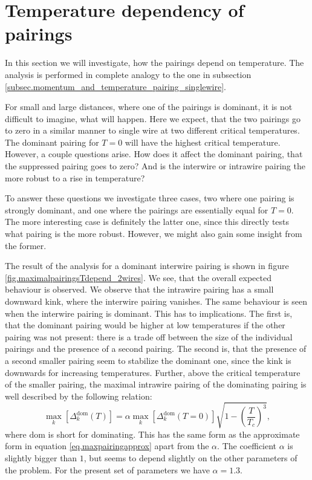 \section{Temperature dependency of pairings} \label{sec.2wirespairingstemperature}
In this section we will investigate, how the pairings depend on temperature. The analysis is performed in complete analogy to the one in subsection \ref{subsec.momentum_and_temperature_pairing_singlewire}. 

For small and large distances, where one of the pairings is dominant, it is not difficult to imagine, what will happen. Here we expect, that the two pairings go to zero in a similar manner to single wire at two different critical temperatures. The dominant pairing for $T = 0$ will have the highest critical temperature. However, a couple questions arise. How does it affect the dominant pairing, that the suppressed pairing goes to zero? And is the interwire or intrawire pairing the more robust to a rise in temperature?

To answer these questions we investigate three cases, two where one pairing is strongly dominant, and one where the pairings are essentially equal for $T = 0$. The more interesting case is definitely the latter one, since this directly tests what pairing is the more robust. However, we might also gain some insight from the former. 

The result of the analysis for a dominant interwire pairing is shown in figure \ref{fig.maximalpairingsTdepend_2wires}. We see, that the overall expected behaviour is observed. We observe that the intrawire pairing has a small downward kink, where the interwire pairing vanishes. The same behaviour is seen when the interwire pairing is dominant. This has to implications. The first is, that the dominant pairing would be higher at low temperatures if the other pairing was not present: there is a trade off between the size of the individual pairings and the presence of a second pairing. The second is, that the presence of a second smaller pairing seem to stabilize the dominant one, since the kink is downwards for increasing temperatures. Further, above the critical temperature of the smaller pairing, the maximal intrawire pairing of the dominating pairing is well described by the following relation:
\begin{equation}
\max_k[\Delta^{\text{dom}}_k(T)] = \alpha \max_k[\Delta^{\text{dom}}_k(T = 0)] \sqrt{1 - \left(\frac{T}{T_c}\right)^3},
\label{eq.DeltaapproxaboveTC1}
\end{equation}
where $\text{dom}$ is short for dominating. This has the same form as the approximate form in equation \eqref{eq.maxpairingapprox} apart from the $\alpha$. The coefficient $\alpha$ is slightly bigger than $1$, but seems to depend slightly on the other parameters of the problem. For the present set of parameters we have $\alpha = 1.3$. 

